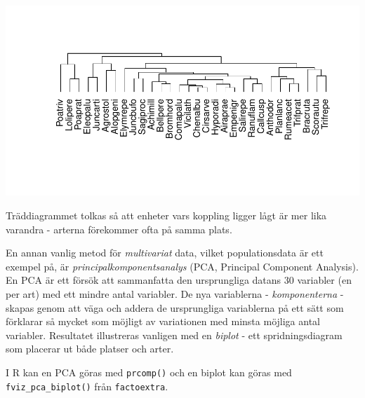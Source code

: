 \documentclass[
]{book}
\newenvironment{Shaded}{\begin{snugshade}}{\end{snugshade}}
\newcommand{\AttributeTok}[1]{\textcolor[rgb]{0.13,0.29,0.53}{#1}}
\newcommand{\DecValTok}[1]{\textcolor[rgb]{0.00,0.00,0.81}{#1}}
\newcommand{\FunctionTok}[1]{\textcolor[rgb]{0.13,0.29,0.53}{\textbf{#1}}}
\newcommand{\NormalTok}[1]{#1}
\newcommand{\OtherTok}[1]{\textcolor[rgb]{0.56,0.35,0.01}{#1}}
\newcommand{\SpecialCharTok}[1]{\textcolor[rgb]{0.81,0.36,0.00}{\textbf{#1}}}
\newcommand{\StringTok}[1]{\textcolor[rgb]{0.31,0.60,0.02}{#1}}
\theoremstyle{definition}
\theoremstyle{definition}
\theoremstyle{definition}
\theoremstyle{definition}
\theoremstyle{remark}
\begin{document}
\begin{center}\includegraphics{R-anvisningar_files/figure-latex/unnamed-chunk-254-1} \end{center}

Träddiagrammet tolkas så att enheter vars koppling ligger lågt är mer lika varandra - arterna förekommer ofta på samma plats.

En annan vanlig metod för \emph{multivariat} data, vilket populationsdata är ett exempel på, är \emph{principalkomponentsanalys} (PCA, Principal Component Analysis). En PCA är ett försök att sammanfatta den ursprungliga datans 30 variabler (en per art) med ett mindre antal variabler. De nya variablerna - \emph{komponenterna} - skapas genom att väga och addera de ursprungliga variablerna på ett sätt som förklarar så mycket som möjligt av variationen med minsta möjliga antal variabler. Resultatet illustreras vanligen med en \emph{biplot} - ett spridningsdiagram som placerar ut både platser och arter.

I R kan en PCA göras med \texttt{prcomp()} och en biplot kan göras med \texttt{fviz\_pca\_biplot()} från \texttt{factoextra}.

\begin{Shaded}
\end{Shaded}
\end{document}
